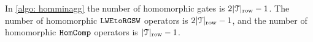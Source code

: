 \begin{lemma}
    In \cref{algo: homminagg}
    the number of homomorphic \cmux gates is 
    $2|\mathcal{T}|_{\rm row} - 1$. 
    The number of homomorphic 
    $\texttt{LWEtoRGSW}$ operators is 
    $2|\mathcal{T}|_{\rm row} -1$,
    and the number of homomorphic 
    $\texttt{HomComp}$ operators is
    $|\mathcal{T}|_{\rm row} -1$.
    \label{lemma: homminagg}
\end{lemma}




